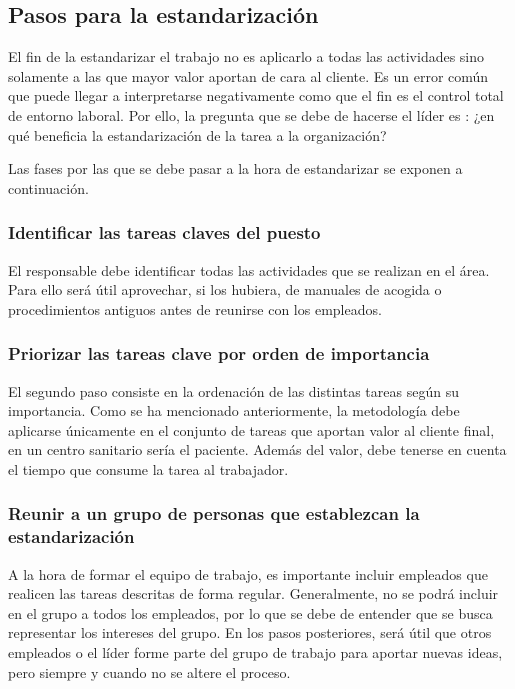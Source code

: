 \subsection{Pasos para la estandarización}

El fin de la estandarizar el trabajo no es aplicarlo a todas las actividades sino solamente a las que mayor valor aportan de cara al cliente. Es un error común que puede llegar a interpretarse negativamente como que el fin es el control total de entorno laboral. Por ello, la pregunta que se debe de hacerse el líder es : ¿en qué beneficia la estandarización de la tarea a la organización?

Las fases por las que se debe pasar a la hora de estandarizar se exponen a continuación.

\subsubsection{Identificar las tareas claves del puesto}

El responsable debe identificar todas las actividades que se realizan en el área.
Para ello será útil aprovechar, si los hubiera, de manuales de acogida o procedimientos antiguos antes de reunirse con los empleados.

\subsubsection{Priorizar las tareas clave por orden de importancia}

El segundo paso consiste en la ordenación de las distintas tareas según su importancia.
Como se ha mencionado anteriormente, la metodología debe aplicarse únicamente en el conjunto de tareas que aportan valor al cliente final, en un centro sanitario sería el paciente.
Además del valor, debe tenerse en cuenta el tiempo que consume la tarea al trabajador.

\subsubsection{Reunir a un grupo de personas que establezcan la estandarización}

A la hora de formar el equipo de trabajo, es importante incluir empleados que realicen las tareas descritas de forma regular.
Generalmente, no se podrá incluir en el grupo a todos los empleados, por lo que se debe de entender que se busca representar los intereses del grupo.
En los pasos posteriores, será útil que otros empleados o el líder forme parte del grupo de trabajo para aportar nuevas ideas, pero siempre y cuando no se altere el proceso.


